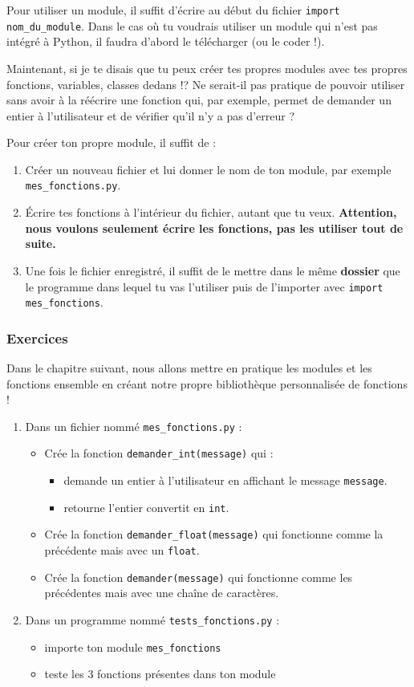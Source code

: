 \documentclass[11pt]{article}
\begin{document}
Pour utiliser un module, il suffit d'écrire au début du fichier \texttt{import nom\_du\_module}. Dans le cas où tu voudrais utiliser un module qui n'est pas intégré à Python, il faudra d'abord le télécharger (ou le coder !).

Maintenant, si je te disais que tu peux créer tes propres modules avec tes propres fonctions, variables, classes dedans !? Ne serait-il pas pratique de pouvoir utiliser sans avoir à la réécrire une fonction qui, par exemple, permet de demander un entier à l'utilisateur et de vérifier qu'il n'y a pas d'erreur ?

Pour créer ton propre module, il suffit de :
\begin{enumerate}
\item Créer un nouveau fichier et lui donner le nom de ton module, par exemple \texttt{mes\_fonctions.py}.
\item Écrire tes fonctions à l'intérieur du fichier, autant que tu veux. \textbf{Attention, nous voulons seulement écrire les fonctions, pas les utiliser tout de suite.}
\item Une fois le fichier enregistré, il suffit de le mettre dans le même \textbf{dossier} que le programme dans lequel tu vas l'utiliser puis de l'importer avec \texttt{import mes\_fonctions}.
\end{enumerate}

\subsubsection*{Exercices}
\label{sec:org91678e2}
Dans le chapitre suivant, nous allons mettre en pratique les modules et les fonctions ensemble en créant notre propre bibliothèque personnalisée de fonctions !

\begin{enumerate}
\item Dans un fichier nommé \texttt{mes\_fonctions.py} :
\begin{itemize}
\item Crée la fonction \texttt{demander\_int(message)} qui :
\begin{itemize}
\item demande un entier à l'utilisateur en affichant le message \texttt{message}.
\item retourne l'entier convertit en \texttt{int}.
\end{itemize}
\item Crée la fonction \texttt{demander\_float(message)} qui fonctionne comme la précédente mais avec un \texttt{float}.
\item Crée la fonction \texttt{demander(message)} qui fonctionne comme les précédentes mais avec une chaîne de caractères.
\end{itemize}

\item Dans un programme nommé \texttt{tests\_fonctions.py} :
\begin{itemize}
\item importe ton module \texttt{mes\_fonctions}
\item teste les 3 fonctions présentes dans ton module
\end{itemize}
\end{enumerate}
\end{document}
